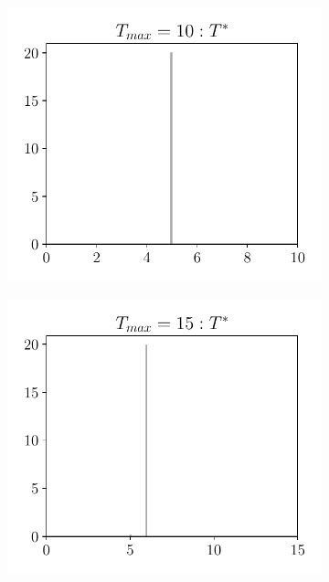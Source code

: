\begin{figure}[h!]
	\centering
	\begin{subfigure}{0.25\textwidth}
		\centering
		\includegraphics[width=1\linewidth]{plots/simulation/T_10_T_ast_adaptive.pdf}
	\end{subfigure}%
	\begin{subfigure}{0.25\textwidth}
		\centering
		\includegraphics[width=1\linewidth]{plots/simulation/T_15_T_ast_adaptive.pdf}

\end{subfigure}
\end{figure}
